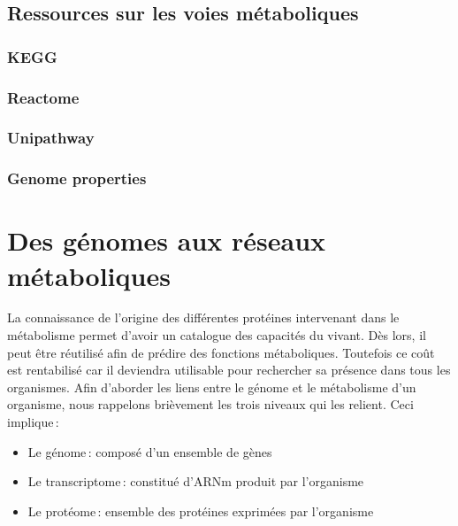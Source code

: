 \begin{refsection}
    
    \subsection{Ressources sur les voies métaboliques}
    \subsubsection{KEGG}
    \subsubsection{Reactome}
    \subsubsection{Unipathway}
    \subsubsection{Genome properties}
    
    \section{Des génomes aux réseaux métaboliques}
    
    La connaissance de l'origine des différentes protéines intervenant dans le métabolisme permet d'avoir un catalogue des capacités du vivant. Dès lors, il peut être réutilisé afin de prédire des fonctions métaboliques. Toutefois ce coût est rentabilisé car il deviendra utilisable pour rechercher sa présence dans tous les organismes. Afin d'aborder les liens entre le génome et le métabolisme d'un organisme, nous rappelons brièvement les trois niveaux qui les relient. Ceci implique :
    
    \begin{itemize}
        \item Le génome : composé d'un ensemble de gènes
        \item Le transcriptome : constitué d'\gls{ARNm} produit par l'organisme
        \item Le protéome : ensemble des protéines exprimées par l'organisme
    \end{itemize}
    

\end{refsection}

